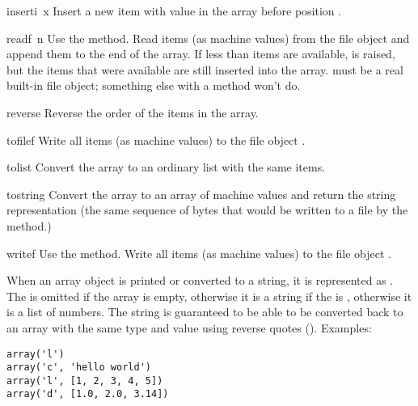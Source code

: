 \begin{funcdesc}{insert}{i\, x}
Insert a new item with value  in the array before position
.
\end{funcdesc}

\begin{funcdesc}{read}{f\, n}
  {Use the  method.}
Read  items (as machine values) from the file object 
and append them to the end of the array.  If less than  items
are available,  is raised, but the items that were
available are still inserted into the array.   must be a real
built-in file object; something else with a  method won't
do.
\end{funcdesc}

\begin{funcdesc}{reverse}{}
Reverse the order of the items in the array.
\end{funcdesc}

\begin{funcdesc}{tofile}{f}
Write all items (as machine values) to the file object .
\end{funcdesc}

\begin{funcdesc}{tolist}{}
Convert the array to an ordinary list with the same items.
\end{funcdesc}

\begin{funcdesc}{tostring}{}
Convert the array to an array of machine values and return the
string representation (the same sequence of bytes that would
be written to a file by the  method.)
\end{funcdesc}

\begin{funcdesc}{write}{f}
  {Use the  method.}
Write all items (as machine values) to the file object .
\end{funcdesc}

When an array object is printed or converted to a string, it is
represented as .  The
 is omitted if the array is empty, otherwise it is a
string if the  is , otherwise it is a list of
numbers.  The string is guaranteed to be able to be converted back to
an array with the same type and value using reverse quotes
().  Examples:

\begin{verbatim}
array('l')
array('c', 'hello world')
array('l', [1, 2, 3, 4, 5])
array('d', [1.0, 2.0, 3.14])
\end{verbatim}
